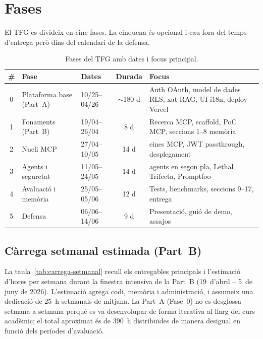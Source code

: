 \section{Fases}
\label{sec:fases}

El TFG es divideix en cinc fases. La cinquena és opcional i cau fora del
temps d'entrega però dins del calendari de la defensa.

\begin{table}[htbp]
  \centerfloat
  \footnotesize
  \caption{Fases del TFG amb dates i focus principal.}
  \label{tab:fases}
  \begin{tabular}{@{}cllc>{\raggedright\arraybackslash}p{5.5cm}@{}}
    \toprule
    \# & Fase & Dates & Durada & Focus \\
    \midrule
    0 & Plataforma base (Part~A) & 10/25--04/26 & $\sim$180 d & Auth OAuth, model de dades RLS, xat RAG, UI i18n, deploy Vercel \\
    1 & Fonaments (Part~B) & 19/04--26/04 & 8 d & Recerca MCP, scaffold, PoC MCP, seccions 1--8 memòria \\
    2 & Nucli MCP & 27/04--10/05 & 14 d & 8 eines MCP, JWT passthrough, desplegament \\
    3 & Agents i seguretat & 11/05--24/05 & 14 d & 2 agents en segon pla, Lethal Trifecta, Promptfoo \\
    4 & Avaluació i memòria & 25/05--05/06 & 12 d & Tests, benchmarks, seccions 9--17, entrega \\
    5 & Defensa & 06/06--14/06 & 9 d & Presentació, guió de demo, assajos \\
    \bottomrule
  \end{tabular}
\end{table}

\subsection{Càrrega setmanal estimada (Part~B)}

La taula~\ref{tab:carrega-setmanal} recull els entregables principals i
l'estimació d'hores per setmana durant la finestra intensiva de la
Part~B (19~d'abril -- 5~de juny de 2026). L'estimació agrega codi,
memòria i administració, i assumeix una dedicació de 25~h setmanals de
mitjana. La Part~A (Fase~0) no es desglossa setmana a setmana perquè
es va desenvolupar de forma iterativa al llarg del curs acadèmic; el
total aproximat és de 390~h distribuïdes de manera desigual en funció
dels períodes d'avaluació.


